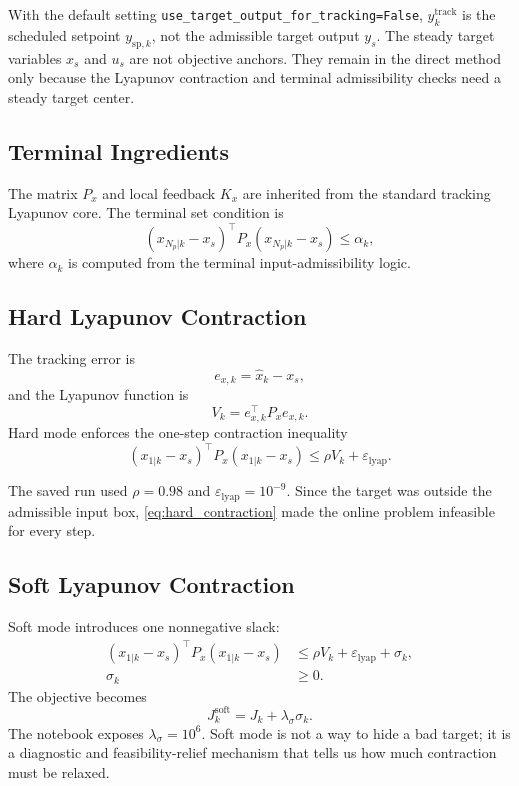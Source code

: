 \documentclass[11pt]{article}
\begin{document}
With the default setting \texttt{use\_target\_output\_for\_tracking=False},
\(y_k^{\mathrm{track}}\) is the scheduled setpoint \(y_{\mathrm{sp},k}\), not
the admissible target output \(y_s\). The steady target variables \(x_s\) and
\(u_s\) are not objective anchors. They remain in the direct method only because
the Lyapunov contraction and terminal admissibility checks need a steady target
center.

\subsection{Terminal Ingredients}

The matrix \(P_x\) and local feedback \(K_x\) are inherited from the standard
tracking Lyapunov core. The terminal set condition is
\begin{equation}
(x_{N_p|k}-x_s)^\top P_x (x_{N_p|k}-x_s)
\le \alpha_k,
\end{equation}
where \(\alpha_k\) is computed from the terminal input-admissibility logic.

\subsection{Hard Lyapunov Contraction}

The tracking error is
\begin{equation}
e_{x,k}=\hat x_k-x_s,
\end{equation}
and the Lyapunov function is
\begin{equation}
V_k = e_{x,k}^\top P_x e_{x,k}.
\end{equation}
Hard mode enforces the one-step contraction inequality
\begin{equation}
(x_{1|k}-x_s)^\top P_x (x_{1|k}-x_s)
\le
\rho V_k + \varepsilon_{\mathrm{lyap}}.
\label{eq:hard_contraction}
\end{equation}

The saved run used \(\rho=0.98\) and
\(\varepsilon_{\mathrm{lyap}}=10^{-9}\). Since the target was outside the
admissible input box, \eqref{eq:hard_contraction} made the online problem
infeasible for every step.

\subsection{Soft Lyapunov Contraction}

Soft mode introduces one nonnegative slack:
\begin{align}
(x_{1|k}-x_s)^\top P_x (x_{1|k}-x_s)
&\le
\rho V_k + \varepsilon_{\mathrm{lyap}}+\sigma_k,\\
\sigma_k &\ge 0.
\end{align}
The objective becomes
\begin{equation}
J_k^{\mathrm{soft}} = J_k + \lambda_\sigma \sigma_k.
\end{equation}
The notebook exposes \(\lambda_\sigma=10^6\). Soft mode is not a way to hide a
bad target; it is a diagnostic and feasibility-relief mechanism that tells us
how much contraction must be relaxed.
\end{document}
